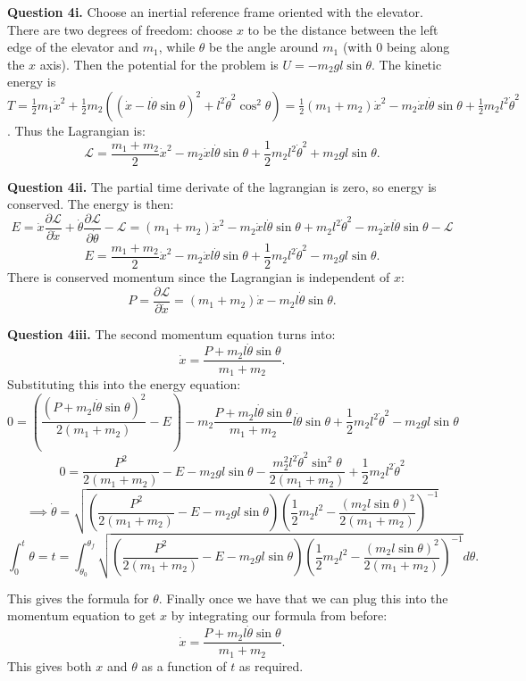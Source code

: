 \documentclass[letterpaper, reqno,11pt]{article}
\begin{document}
{\noindent\bf Question 4i.} Choose an inertial reference frame oriented with the elevator. There are two degrees of freedom: choose $x$ to be the distance between the left edge of the elevator and $ m_1$, while $\theta$ be the angle around $m_1$ (with 0 being along the $x$ axis). Then the potential for the problem is $U=-m_2gl\sin\theta$. The kinetic energy is $T=\frac{1}{2}m_1\dot x^2+\frac{1}{2}m_2((\dot x-l\dot\theta\sin\theta)^2+l^2\dot\theta^2\cos^2\theta)=\frac{1}{2}(m_1+m_2)\dot x^2-m_2\dot x l\dot\theta\sin\theta+\frac{1}{2}m_2l^2\dot\theta^2$. Thus the Lagrangian is: 
\[
\mathcal L=\frac{m_1+m_2}{2}\dot x^2-m_2\dot x l\dot\theta\sin\theta+\frac{1}{2}m_2l^2\dot\theta^2+m_2gl\sin\theta
.\]

{\noindent\bf Question 4ii.} The partial time derivate of the lagrangian is zero, so energy is conserved. The energy is then: 
\[
E=\dot x\frac{\partial\mathcal L}{\partial \dot x}+\dot \theta\frac{\partial\mathcal L}{\partial \dot \theta}-\mathcal L=(m_1+m_2)\dot x^2-m_2\dot xl\dot \theta\sin\theta+m_2l^2\dot\theta^2-m_2\dot xl\dot\theta\sin\theta-\mathcal L
\]
\[
E=\frac{m_1+m_2}{2}\dot x^2-m_2\dot x l\dot\theta\sin\theta+\frac{1}{2}m_2l^2\dot\theta^2-m_2gl\sin\theta
.\]
There is conserved momentum since the Lagrangian is independent of $x$: 
\[
P=\frac{\partial\mathcal L}{\partial \dot x}=(m_1+m_2)\dot x-m_2l\dot\theta\sin\theta
.\]

{\noindent\bf Question 4iii.} The second momentum equation turns into: 
\[
\dot x=\frac{P+m_2l\dot\theta\sin\theta}{m_1+m_2}
.\]
Substituting this into the energy equation: 
\[
0=\left( \frac{(P+m_2l\dot\theta\sin\theta)^2}{2(m_1+m_2)}-E \right)-m_2\frac{P+m_2l\dot\theta\sin\theta}{m_1+m_2} l\dot\theta\sin\theta+\frac{1}{2}m_2l^2\dot\theta^2-m_2gl\sin\theta
\]
\[
0=\frac{P^2}{2(m_1+m_2)}-E-m_2gl\sin\theta-\frac{m_2^2l^2\dot\theta^2\sin^2\theta}{2(m_1+m_2)}+\frac{1}{2}m_2l^2\dot\theta^2
\]
\[
\implies \dot\theta=\sqrt{\left( \frac{P^2}{2(m_1+m_2)} -E-m_2gl\sin\theta \right)\left( \frac{1}{2}m_2l^2-\frac{(m_2l\sin\theta)^2}{2(m_1+m_2)} \right)^{-1}  } 
\]
\[
\int_0^t\theta = t=\int_{\theta_0}^{\theta_f}\sqrt{\left( \frac{P^2}{2(m_1+m_2)} -E-m_2gl\sin\theta \right)\left( \frac{1}{2}m_2l^2-\frac{(m_2l\sin\theta)^2}{2(m_1+m_2)} \right)^{-1}  }d\theta
.\]

This gives the formula for $\theta$. Finally once we have that we can plug this into the momentum equation to get $x$ by integrating our formula from before: 
\[
\dot x=\frac{P+m_2l\dot\theta\sin\theta}{m_1+m_2}
.\]
This gives both $x$ and $\theta$ as a function of $t$ as required. 
\end{document}
